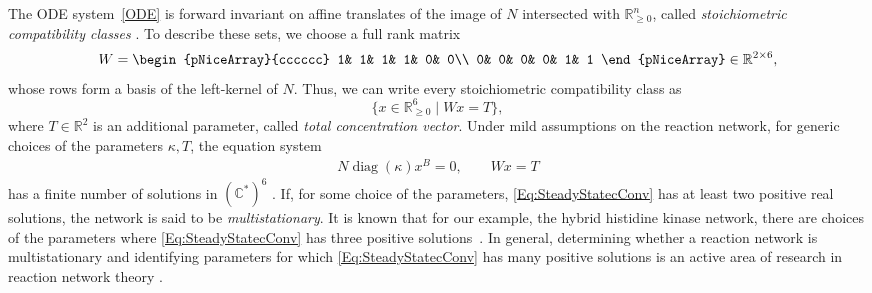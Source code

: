 \documentclass{article}
\theoremstyle{definition}
\DeclareMathOperator{\diag}{diag}
\begin{document}
The ODE system~\eqref{ODE} is forward invariant on affine translates of the image of $N$ intersected with $\mathbb{R}^n_{\geq0}$, called \emph{stoichiometric compatibility classes} \cite{Sonntag:ForwardInv,ForInv_Volpert}. To describe these sets, we choose a full rank matrix 
\begin{align*}
      W =  \begin{pNiceArray}{cccccc}
       1& 1& 1& 1& 0& 0\\
     0& 0& 0& 0& 1& 1
     \end{pNiceArray} \in \mathbb{R}^{2\times 6},
    \end{align*}
whose rows form a basis of the left-kernel of $N$. Thus, we can write every stoichiometric compatibility class as
\[  \{ x \in \mathbb{R}^6_{\geq0} \mid Wx = T \},\]
where $T \in \mathbb{R}^2$ is an additional parameter, called \emph{total concentration vector}. Under mild assumptions on the reaction network, for generic choices of the parameters $\kappa,T$, the equation system
\begin{align}
\label{Eq:SteadyStatecConv}
N\diag(\kappa) x^B = 0, \qquad Wx = T
\end{align}
has a finite number of solutions in $(\mathbb{C}^*)^6$  \cite{FeliuDim}. If, for some choice of the parameters, \eqref{Eq:SteadyStatecConv} has at least two positive real solutions, the network is said to be \emph{multistationary}. It is known that for our example, the hybrid histidine kinase network, there are choices of the parameters where \eqref{Eq:SteadyStatecConv} has three positive solutions~\cite{HHK,PLOS_IdParaRegions}. In general, determining whether a reaction network is multistationary and identifying parameters for which \eqref{Eq:SteadyStatecConv} has many positive solutions is an active area of research in reaction network theory \cite{shiu:survey, PLOS_IdParaRegions, bihan:regions2,bihan:regions3,bihan:regions,MultStrucRN,conradi:cones,MultiSite_Phosph_Dicken,markev}.
\end{document}
